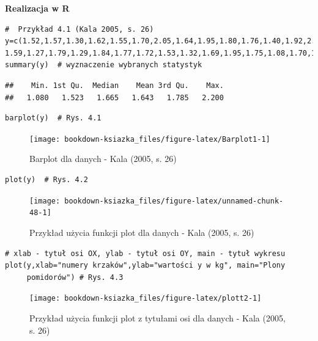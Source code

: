 \documentclass[12pt,B5paper,]{book}
\begin{document}
\vspace{0.8cm} \textbf{Realizacja w R}

\begin{verbatim}
#  Przykład 4.1 (Kala 2005, s. 26)
y=c(1.52,1.57,1.30,1.62,1.55,1.70,2.05,1.64,1.95,1.80,1.76,1.40,1.92,2.20,1.57,
1.59,1.27,1.79,1.29,1.84,1.77,1.72,1.53,1.32,1.69,1.95,1.75,1.08,1.70,1.45)
summary(y)  # wyznaczenie wybranych statystyk
\end{verbatim}

\begin{verbatim}
##    Min. 1st Qu.  Median    Mean 3rd Qu.    Max. 
##   1.080   1.523   1.665   1.643   1.785   2.200
\end{verbatim}

\begin{verbatim}
barplot(y)  # Rys. 4.1
\end{verbatim}

\begin{figure}[H]

{\centering \texttt{[image: bookdown-ksiazka\_files/figure-latex/Barplot1-1]} 

}

\caption{Barplot dla danych - Kala (2005, s. 26)}\label{fig:Barplot1}
\end{figure}

\begin{verbatim}
plot(y)  # Rys. 4.2
\end{verbatim}

\begin{figure}[H]

{\centering \texttt{[image: bookdown-ksiazka\_files/figure-latex/unnamed-chunk-48-1]} 

}

\caption{Przykład użycia funkcji plot dla danych - Kala (2005, s. 26)}\label{fig:unnamed-chunk-48}
\end{figure}

\begin{verbatim}
# xlab - tytuł osi OX, ylab - tytuł osi OY, main - tytuł wykresu
plot(y,xlab="numery krzaków",ylab="wartości y w kg", main="Plony
     pomidorów") # Rys. 4.3
\end{verbatim}

\begin{figure}[H]

{\centering \texttt{[image: bookdown-ksiazka\_files/figure-latex/plott2-1]} 

}

\caption{Przykład użycia funkcji plot z tytułami osi dla danych - Kala (2005, s. 26)}\label{fig:plott2}
\end{figure}
\end{document}
